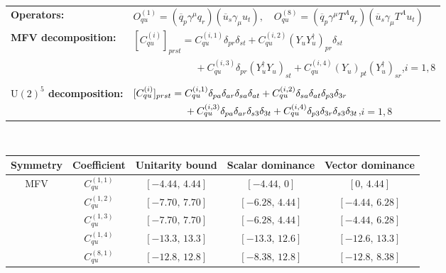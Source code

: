 \begin{table}[tbp]
\centering
{\small
\begin{tabular}{ll}
    \textbf{Operators:} &
        $\boxed{O_{qu}^{(1)} = (\overline q_p \gamma^\mu q_r)(\overline u_s \gamma_\mu u_t),\quad O_{qu}^{(8)} = (\overline q_p \gamma^\mu T^A q_r)(\overline u_s \gamma_\mu T^A u_t)}$ \\[0.2cm]
    \textbf{MFV decomposition:} &
        $[C_{qu}^{(i)}]_{prst} =
            C_{qu}^{(i,1)}\delta_{pr}\delta_{st}
            + C_{qu}^{(i,2)}(Y_u Y_u^\dagger)_{pr}\delta_{st}$ \\
        & $\phantom{[C_{qu}^{(i)}]_{prst} ={}}+ C_{qu}^{(i,3)}\delta_{pr}(Y_u^\dagger Y_u)_{st}
            + C_{qu}^{(i,4)}(Y_u)_{pt}(Y_u^\dagger)_{sr}$,\quad $i=1,8$ \\[0.15cm]
    \textbf{$\mathrm{U}(2)^5$ decomposition:} &
        $[C_{qu}^{(i)}]_{prst} =
            C_{qu}^{(i,1)}\Pij{p}{r}{a}\Pij{s}{t}{a}
            + C_{qu}^{(i,2)}\Pij{s}{t}{a}\delta_{p3}\delta_{3r}$ \\
        & $\phantom{[C_{qu}^{(i)}]_{prst} ={}}+ C_{qu}^{(i,3)}\Pij{p}{r}{a}\delta_{s3}\delta_{3t}
            + C_{qu}^{(i,4)}\delta_{p3}\delta_{3r}\delta_{s3}\delta_{3t}$,\quad $i=1,8$ \\
\end{tabular}
\\[0.3cm]
\renewcommand{\arraystretch}{1.3}
\begin{tabular}{ccccc}
    \toprule
    \rowcolor{hdrcolor}
    \textbf{Symmetry} & \textbf{Coefficient}
        & \textbf{Unitarity bound}
        & \textbf{Scalar dominance}
        & \textbf{Vector dominance} \\
    \midrule
    \multirow{8}{*}{MFV}
        & $C_{qu}^{(1,1)}$ & $[-4.44,\, 4.44]$ & $[-4.44,\, 0]$    & $[0,\, 4.44]$    \\
        & $C_{qu}^{(1,2)}$ & $[-7.70,\, 7.70]$ & $[-6.28,\, 4.44]$ & $[-4.44,\, 6.28]$ \\
        & $C_{qu}^{(1,3)}$ & $[-7.70,\, 7.70]$ & $[-6.28,\, 4.44]$ & $[-4.44,\, 6.28]$ \\
        & $C_{qu}^{(1,4)}$ & $[-13.3,\, 13.3]$ & $[-13.3,\, 12.6]$ & $[-12.6,\, 13.3]$ \\
        & $C_{qu}^{(8,1)}$ & $[-12.8,\, 12.8]$ & $[-8.38,\, 12.8]$ & $[-12.8,\, 8.38]$ \\

\end{tabular}}
\end{table}
